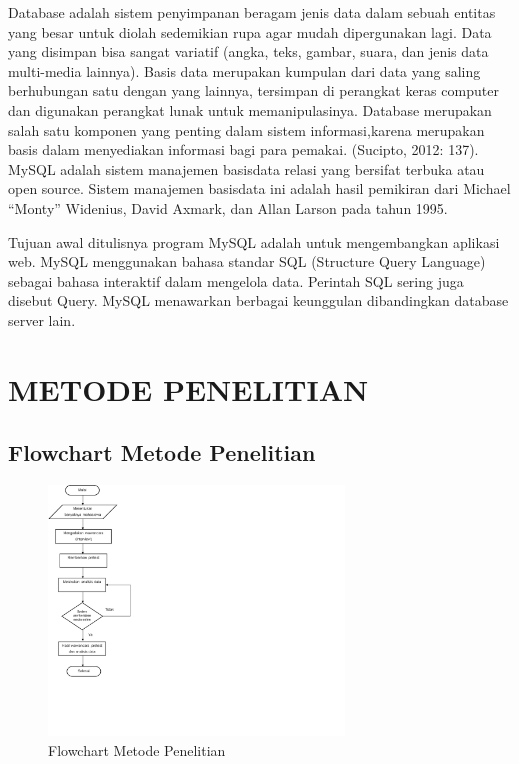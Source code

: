 \documentclass{jtetiproposalskripsi}
\begin{document}
Database adalah sistem penyimpanan beragam jenis data dalam sebuah entitas yang besar untuk diolah sedemikian rupa agar mudah dipergunakan lagi. Data yang disimpan bisa sangat variatif (angka, teks, gambar, suara, dan jenis data multi-media lainnya). Basis data merupakan kumpulan dari data yang saling berhubungan satu dengan yang lainnya, tersimpan di perangkat keras computer dan digunakan perangkat lunak untuk memanipulasinya. Database merupakan salah satu komponen yang penting dalam sistem informasi,karena merupakan basis dalam menyediakan informasi bagi para pemakai. (Sucipto, 2012: 137).
MySQL adalah sistem manajemen basisdata relasi yang bersifat terbuka atau open source. Sistem manajemen basisdata ini adalah hasil pemikiran dari Michael “Monty” Widenius, David Axmark, dan Allan Larson pada tahun 1995. 

Tujuan awal ditulisnya program MySQL adalah untuk mengembangkan aplikasi web. MySQL menggunakan bahasa standar SQL (Structure Query Language) sebagai bahasa interaktif dalam mengelola data. 
Perintah SQL sering juga disebut Query. MySQL menawarkan berbagai keunggulan dibandingkan database server lain.


\chapter{METODE PENELITIAN}

\section{Flowchart Metode Penelitian}
\begin{figure}[h]
\centering 
 \includegraphics[width=0.7\textwidth]{gambar/1}  
 \caption{Flowchart Metode Penelitian}
\end{figure}
\end{document}
